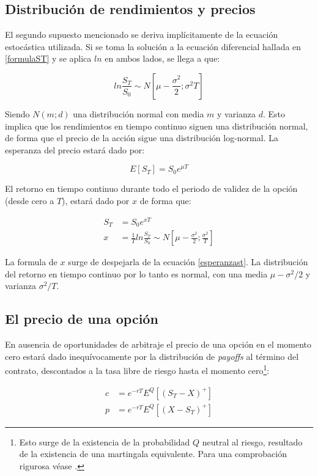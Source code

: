 \subsection{Distribución de rendimientos y precios}

El segundo supuesto mencionado se deriva implícitamente de la ecuación estocástica utilizada. Si se toma la solución a la ecuación diferencial hallada en \eqref{formulaST} y se aplica $ln$ en ambos lados, se llega a que:

\[
	ln \frac{S_T}{S_0} \sim N\left[\mu-\frac{\sigma^2}{2} ; \sigma^2 T \right]
\]

Siendo $N(m;d)$ una distribución normal con media $m$ y varianza $d$\cite[p.278]{hulleng}. Esto implica que los rendimientos en tiempo continuo siguen una distribución normal, de forma que el precio de la acción sigue una distribución log-normal. La esperanza del precio estará dado por: 

\[ E[S_T] = S_0 e^{\mu T} \nonumber \]

El retorno en tiempo continuo durante todo el periodo de validez de la opción (desde cero a $T$), estará dado por $x$ de forma que\cite{hulleng}:

\begin{align}
	S_T &= S_0 e^{xT} \label{esperanzast} \\
	x &=  \frac{1}{T} ln \frac{S_T}{S_0} \sim N\left[ \mu - \frac{\sigma^2}{2} ; \frac{\sigma^2}{T} \right] \nonumber
\end{align}

La formula de $x$ surge de despejarla de la ecuación \eqref{esperanzast}. La distribución del retorno en tiempo continuo por lo tanto es normal, con una media $\mu - \sigma^2/2$ y varianza $\sigma^2/T$.

\subsection{El precio de una opción}

En ausencia de oportunidades de arbitraje el precio de una opción en el momento cero estará dado inequívocamente por la distribución de \textit{payoffs} al término del contrato, descontados a la tasa libre de riesgo hasta el momento cero\footnote{Esto surge de la existencia de la probabilidad $Q$ neutral al riesgo, resultado de la existencia de una martingala equivalente. Para una comprobación rigurosa véase \cite[p.140]{oksendal}.}:

\begin{align}
	c &= e^{-rT}E^Q[(S_T-X)^+] \label{ecuacionBasicaCall} \\
	p &= e^{-rT}E^Q[(X-S_T)^+]
\end{align}

